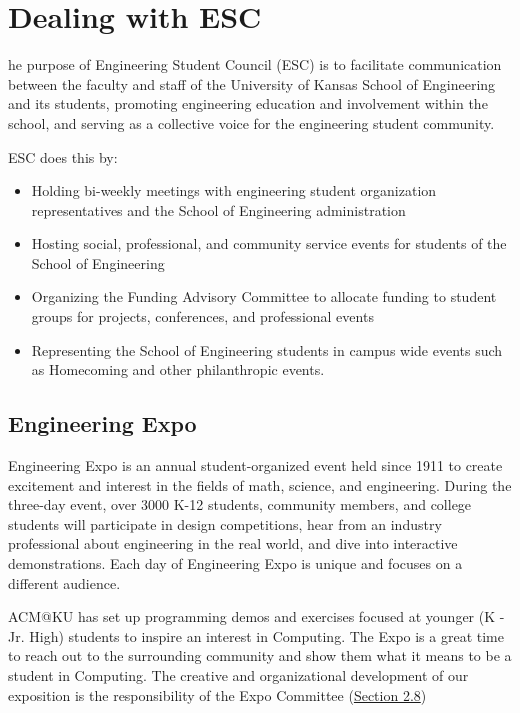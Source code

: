 %
%
\let\textcircled=\pgftextcircled
\chapter{Dealing with ESC}
\label{chap:esc}

he purpose of Engineering Student Council (ESC) is to facilitate communication between the faculty and staff of the University of Kansas School of Engineering and its students, promoting engineering education and involvement within the school, and serving as a collective voice for the engineering student community.

ESC does this by:
\begin{itemize}
	\item Holding bi-weekly meetings with engineering student organization representatives and the School of Engineering administration
	\item Hosting social, professional, and community service events for students of the School of Engineering
	\item Organizing the Funding Advisory Committee to allocate funding to student groups for projects, conferences, and professional events
	\item Representing the School of Engineering students in campus wide events such as Homecoming and other philanthropic events.
\end{itemize}


\section{Engineering Expo}
\label{sec:sec01}

Engineering Expo is an annual student-organized event held since 1911 to create excitement and interest in the fields of math, science, and engineering. During the three-day event, over 3000 K-12 students, community members, and college students will participate in design competitions, hear from an industry professional about engineering in the real world, and dive into interactive demonstrations.  Each day of Engineering Expo is unique and focuses on a different audience.

ACM@KU has set up programming demos and exercises focused at younger (K - Jr. High) students to inspire an interest in Computing. The Expo is a great time to reach out to the surrounding community and show them what it means to be a student in Computing. The creative and organizational development of our exposition is the responsibility of the Expo Committee (\hyperref[sec:committees]{Section 2.8})

